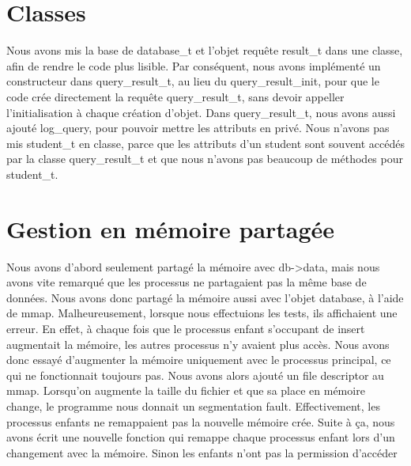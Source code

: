 \documentclass[utf8]{article}
\begin{document}
\section{Classes}
\indent{}
\par
Nous avons mis la base de database\_t et l'objet requête result\_t dans une classe, afin de rendre le code plus lisible. Par conséquent,
nous avons implémenté un constructeur dans query\_result\_t, au lieu du query\_result\_init, pour que le code
crée directement la requête query\_result\_t, sans devoir appeller l'initialisation à chaque création d'objet.
Dans query\_result\_t, nous avons aussi ajouté log\_query, pour pouvoir mettre les attributs en privé.
Nous n'avons pas mis student\_t en classe, parce que les attributs d'un student sont souvent accédés par la classe query\_result\_t
et que nous n'avons pas beaucoup de méthodes pour student\_t.
\par

\section{Gestion en mémoire partagée}
\indent{}
\par
Nous avons d'abord seulement partagé la mémoire avec db->data, mais nous avons vite remarqué que les processus
ne partagaient pas la même base de données. Nous avons donc partagé la mémoire aussi avec l'objet database, à l'aide de mmap.
Malheureusement, lorsque nous effectuions les tests, ils affichaient une erreur. En effet, à chaque fois que le processus enfant
s'occupant de insert augmentait la mémoire, les autres processus n'y avaient plus accès. Nous avons donc essayé d'augmenter la mémoire 
uniquement avec le processus principal, ce qui ne fonctionnait toujours pas. Nous avons alors ajouté un file descriptor au mmap.
Lorsqu'on augmente la taille du fichier et que sa place en mémoire change, le programme nous donnait un segmentation fault.
Effectivement, les processus enfants ne remappaient pas la nouvelle mémoire crée. Suite à ça, nous avons écrit une nouvelle fonction
qui remappe chaque processus enfant lors d'un changement avec la mémoire. Sinon les enfants n'ont pas la permission d'accéder
\par
\end{document}
